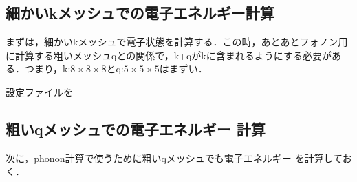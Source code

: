\documentclass[a4j]{jarticle}
\begin{document}
\subsection{細かいkメッシュでの電子エネルギー計算}
まずは，細かいkメッシュで電子状態を計算する．この時，あとあとフォノン用に計算する粗いメッシュqとの関係で，k+qがkに含まれるようにする必要がある．つまり，k:$8\times8\times 8$とq:$5\times5\times5 $はまずい．

設定ファイルを

\subsection{粗いqメッシュでの電子エネルギー 計算}
次に，phonon計算で使うために粗いqメッシュでも電子エネルギー を計算しておく．
\end{document}
